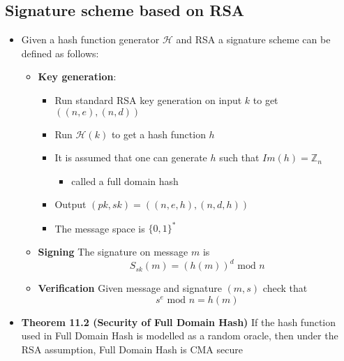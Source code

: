 \subsection{Signature scheme based on RSA}
\begin{itemize}
  \item Given a hash function generator $\mathcal H$ and RSA a signature scheme can be defined as follows:
  \begin{itemize}
  	\item \textbf{Key generation}:
    \begin{itemize}
  		\item Run standard RSA key generation on input $k$ to get $((n,e),(n,d))$
  		\item Run $\mathcal H(k)$ to get a hash function $h$
  		\item It is assumed that one can generate $h$ such that $Im(h) = \mathbb Z_n$
      \begin{itemize}
  			\item called a full domain hash
      \end{itemize}
  		\item Output $(pk,sk) = ((n,e,h),(n,d,h))$
  		\item The message space is $\{0,1\}^*$
    \end{itemize}
  	\item \textbf{Signing} The signature on message $m$ is 
    \[
      S_{sk}(m)=(h(m))^d \text{ mod } n
    \]
  	\item \textbf{Verification} Given message and signature $(m,s)$ check that 
    \[
      s^e \text{ mod } n = h(m)
    \]
  \end{itemize}

  \item \textbf{Theorem 11.2 (Security of Full Domain Hash)} If the hash function used in Full Domain Hash is modelled as a random oracle, then under the RSA assumption, Full Domain Hash is CMA secure

\end{itemize}

